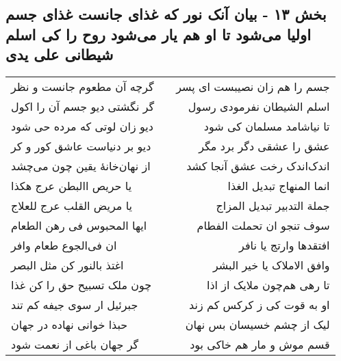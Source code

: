 \begin{center}
\section*{بخش ۱۳ - بیان آنک نور که غذای جانست غذای جسم اولیا می‌شود تا او هم یار می‌شود روح را کی اسلم شیطانی علی یدی}
\label{sec:sh013}
\begin{longtable}{l p{0.5cm} r}
گرچه آن مطعوم جانست و نظر
&&
جسم را هم زان نصیبست ای پسر
\\
گر نگشتی دیو جسم آن را اکول
&&
اسلم الشیطان نفرمودی رسول
\\
دیو زان لوتی که مرده حی شود
&&
تا نیاشامد مسلمان کی شود
\\
دیو بر دنیاست عاشق کور و کر
&&
عشق را عشقی دگر برد مگر
\\
از نهان‌خانهٔ یقین چون می‌چشد
&&
اندک‌اندک رخت عشق آنجا کشد
\\
یا حریص االبطن عرج هکذا
&&
انما المنهاج تبدیل الغذا
\\
یا مریض القلب عرج للعلاج
&&
جملة التدبیر تبدیل المزاج
\\
ایها المحبوس فی رهن الطعام
&&
سوف تنجو ان تحملت الفطام
\\
ان فی‌الجوع طعام وافر
&&
افتقدها وارتج یا نافر
\\
اغتذ بالنور کن مثل البصر
&&
وافق الاملاک یا خیر البشر
\\
چون ملک تسبیح حق را کن غذا
&&
تا رهی هم‌چون ملایک از اذا
\\
جبرئیل ار سوی جیفه کم تند
&&
او به قوت کی ز کرکس کم زند
\\
حبذا خوانی نهاده در جهان
&&
لیک از چشم خسیسان بس نهان
\\
گر جهان باغی از نعمت شود
&&
قسم موش و مار هم خاکی بود
\\
\end{longtable}
\end{center}
